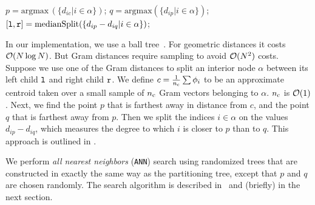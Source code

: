  \begin{algorithm}[!t]
   \caption{{} $[\lc,\rc]=\texttt{metricSplit}(\alpha)$}
 \begin{algorithmic}
   \STATE $p = \mbox{argmax}\,( \{d_{ic}  \lvert i \in \alpha \})$; $q =
   \mbox{argmax}( \{ d_{ip} \lvert i \in \alpha \})$;
   \STATE $[{\tt l},{\tt r}]=\mbox{medianSplit}(\{ d_{ip} - d_{iq} \lvert i \in
   \alpha\})$;
 \end{algorithmic}
 \label{a:split}
 \end{algorithm}  

In our implementation, we use a ball tree~\cite{march-xiao-yu-biros-sisc16}.
For geometric distances it costs $\operatorname{\mathcal{O}}(N \log N)$. But Gram distances require
sampling to avoid $\operatorname{\mathcal{O}}(N^2)$ costs.   Suppose we use one of the Gram
distances to split an interior node $\alpha$ between its left child ${\tt l}$ and
right child ${\tt r}$.  We define $c = \frac{1}{n_{\rm{c}}} \sum \phi_i$ to be an 
approximate centroid taken over a small sample of $n_{\rm{c}}$ Gram vectors belonging to $\alpha$. 
$n_{\rm{c}}$ is $\operatorname{\mathcal{O}}(1)$.
Next, we find the point $p$ that is farthest away in distance from $c$, and the point $q$ that is farthest away from $p$. Then we split the indices $i \in \alpha$ on the values $d_{ip} - d_{iq}$, which measures the degree to which $i$ is closer to $p$ than to $q$. This approach is outlined in . 


We perform \emph{all nearest neighbors} (\texttt{ANN}) search  using randomized trees that are constructed in exactly the same way as the partitioning tree, except that $p$ and $q$ are chosen randomly. The search algorithm is described in~\cite{xiao-biros16} and (briefly) in the next section.


